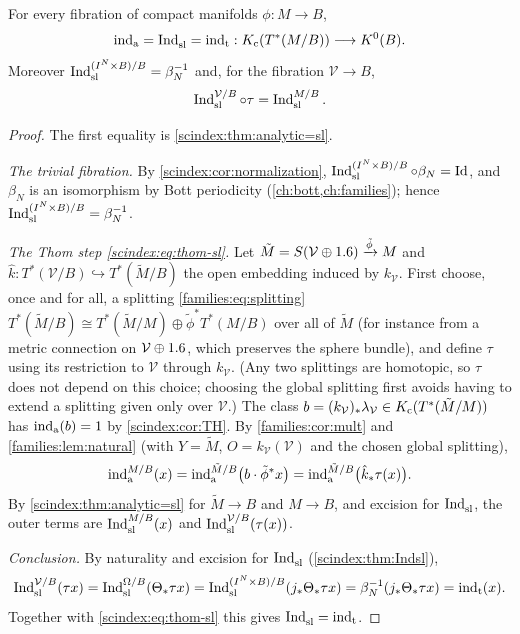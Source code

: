 \begin{theorem}\label{scindex:thm:AS}
  For every fibration of compact manifolds $\phi:M\to B$,
  \begin{equation*}
    \operatorname{ind}_{\mathrm{a}}=\operatorname{Ind}^{}_{\mathrm{sl}}=\operatorname{ind}_{\mathrm{t}}:K_{\mathrm{c}}(T^*(M/B))\longrightarrow K^0(B).
  \end{equation*}
  Moreover $\operatorname{Ind}^{(I^N\times B)/B}_{\mathrm{sl}}=\beta_N^{-1}$ and, for the fibration
  $\mathcal V\to B$,
  \begin{equation}\label{scindex:eq:thom-sl}
    \operatorname{Ind}^{\mathcal V/B}_{\mathrm{sl}}\circ\tau=\operatorname{Ind}^{M/B}_{\mathrm{sl}}.
  \end{equation}
\end{theorem}
\begin{proof}
  The first equality is \cref{scindex:thm:analytic=sl}.

  \emph{The trivial fibration.} By \cref{scindex:cor:normalization},
  $\operatorname{Ind}^{(I^N\times B)/B}_{\mathrm{sl}}\circ\beta_N=\operatorname{Id}$, and $\beta_N$ is an isomorphism by
  Bott periodicity (\cref{ch:bott,ch:families}); hence $\operatorname{Ind}^{(I^N\times B)/B}_{\mathrm{sl}}
  =\beta_N^{-1}$.

  \emph{The Thom step \eqref{scindex:eq:thom-sl}.} Let $\tilde M=S(\mathcal
  V\oplus1.6)\xrightarrow{\tilde\phi}M$ and $\hat k:T^*(\mathcal V/B)
  \hookrightarrow T^*(\tilde M/B)$ the open embedding induced by $k_{\mathcal V}$.
  First choose, once and for all, a splitting \eqref{families:eq:splitting}
  $T^*(\tilde M/B)\cong T^*(\tilde M/M)\oplus\tilde\phi^*T^*(M/B)$ over all of
  $\tilde M$ (for instance from a metric connection on $\mathcal V\oplus1.6$,
  which preserves the sphere bundle), and define $\tau$ using its restriction to
  $\mathcal V$ through $k_{\mathcal V}$. (Any two splittings are homotopic, so
  $\tau$ does not depend on this choice; choosing the global splitting first
  avoids having to extend a splitting given only over $\mathcal V$.)
  The class $b=(k_{\mathcal V})_*\lambda_{\mathcal V}\in K_{\mathrm{c}}(T^*(\tilde M/M))$ has
  $\operatorname{ind}_{\mathrm{a}}(b)=1$ by \cref{scindex:cor:TH}. By \cref{families:cor:mult} and
  \cref{families:lem:natural} (with $Y=\tilde M$, $O=k_{\mathcal V}(\mathcal V)$
  and the chosen global splitting),
  \begin{equation*}
    \operatorname{ind}_{\mathrm{a}}^{M/B}(x)=\operatorname{ind}_{\mathrm{a}}^{\tilde M/B}\bigl(b\cdot\tilde\phi^*x\bigr)
    =\operatorname{ind}_{\mathrm{a}}^{\tilde M/B}\bigl(\hat k_*\tau(x)\bigr).
  \end{equation*}
  By \cref{scindex:thm:analytic=sl} for $\tilde M\to B$ and $M\to B$, and excision
  for $\operatorname{Ind}^{}_{\mathrm{sl}}$, the outer terms are $\operatorname{Ind}^{M/B}_{\mathrm{sl}}(x)$ and
  $\operatorname{Ind}^{\mathcal V/B}_{\mathrm{sl}}(\tau(x))$.

  \emph{Conclusion.} By naturality and excision for $\operatorname{Ind}^{}_{\mathrm{sl}}$
  (\cref{scindex:thm:Indsl}),
  \begin{equation*}
    \operatorname{Ind}^{\mathcal V/B}_{\mathrm{sl}}(\tau x)=\operatorname{Ind}^{\Omega/B}_{\mathrm{sl}}(\Theta_*\tau x)=
    \operatorname{Ind}^{(I^N\times B)/B}_{\mathrm{sl}}(j_*\Theta_*\tau x)=\beta_N^{-1}(j_*\Theta_*\tau x)
    =\operatorname{ind}_{\mathrm{t}}(x).
  \end{equation*}
  Together with \eqref{scindex:eq:thom-sl} this gives $\operatorname{Ind}^{}_{\mathrm{sl}}=\operatorname{ind}_{\mathrm{t}}$.
\end{proof}

